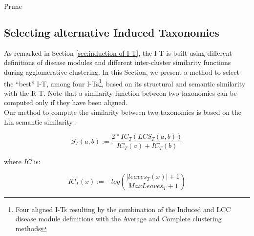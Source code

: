 \documentclass[journal,twoside,web]{ieeecolor}
\begin{document}
\begin{algorithm}
\begin{footnotesize}
\SetAlgoLined

\label{algo:prune}
\end{footnotesize}
\caption{Prune}
\end{algorithm}
\vspace{-9pt}
\subsection{Selecting alternative Induced Taxonomies}
\label{sec:selection}
As remarked in Section \ref{sec:induction of I-T}, the I-T is built using different definitions of disease modules and different inter-cluster similarity functions during agglomerative clustering. 
In this Section, we present a method to select the ``best'' I-T, among four I-Ts\footnote{Four aligned I-Ts resulting by the combination of the Induced and LCC disease module definitions with the Average and Complete clustering methods}, based on its structural and semantic similarity with the R-T. Note that a similarity function between two taxonomies can be computed only if they have been aligned. \\
Our method to compute the similarity between two taxonomies is based on the Lin semantic similarity  \cite{lin1998information}:

\begin{footnotesize}
\begin{equation}
 S_{T}(a, b):= \frac{2*IC_{T}(LCS_{T}(a, b))}{IC_{T}(a) + IC_{T}(b)}\label{eq:lin}
\end{equation}
\end{footnotesize}
\noindent 
where $IC$ is: 
\begin{footnotesize}
\begin{equation}
 IC_{T}(x):= -log(\frac{|leaves_{T}(x)|+1}{MaxLeaves_{T} + 1})
\end{equation}
\end{footnotesize} 
\end{document}
